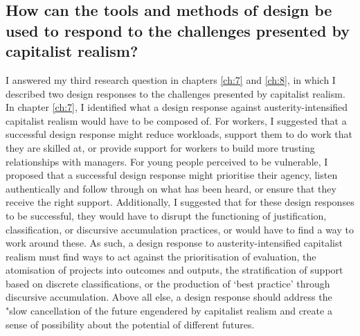 \subsection{How can the tools and methods of design be used to respond to the challenges presented by capitalist realism?}
I answered my third research question in chapters \ref{ch:7} and \ref{ch:8}, in which I described two design responses to the challenges presented by capitalist realism. In chapter \ref{ch:7}, I identified what a design response against austerity-intensified capitalist realism would have to be composed of. For workers, I suggested that a successful design response might reduce workloads, support them to do work that they are skilled at, or provide support for workers to build more trusting relationships with managers. For young people perceived to be vulnerable, I proposed that a successful design response might prioritise their agency, listen authentically and follow through on what has been heard, or ensure that they receive the right support. Additionally, I suggested that for these design responses to be successful, they would have to disrupt the functioning of justification, classification, or discursive accumulation practices, or would have to find a way to work around these. As such, a design response to austerity-intensified capitalist realism must find ways to act against the prioritisation of evaluation, the atomisation of projects into outcomes and outputs, the stratification of support based on discrete classifications, or the production of `best practice' through discursive accumulation. Above all else, a design response should address the "slow cancellation of the future \citep[p. 5]{fisher_ghosts_2014} engendered by capitalist realism and create a sense of possibility about the potential of different futures.

